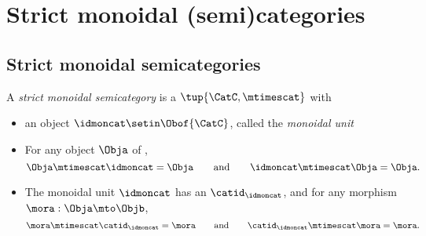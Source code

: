 
\section{Strict monoidal (semi)categories}

\subsection{Strict monoidal semicategories}

\begin{ctdefinition}
    \label{def:strict-monoidal-semicat}
    A \emph{strict monoidal semicategory} is a  $\tup{\CatC, \mtimescat}$ with

    \constit

    \begin{itemize}
        \item an object $\idmoncat \setin \Obof{\CatC}$, called the \emph{monoidal unit}
    \end{itemize}

    \condit

    \begin{itemize}
        \item For any object $\Obja$ of \CatC,
              \begin{equation}
                  \Obja \mtimescat \idmoncat = \Obja \qquad \text{and} \qquad  \idmoncat \mtimescat  \Obja = \Obja.
              \end{equation}
        \item The monoidal unit $\idmoncat$ has an  $\catid_\idmoncat$, and for any morphism $\mora: \Obja \mto \Objb$,
              \begin{equation}
                  \mora \mtimescat \catid_\idmoncat = \mora \qquad \text{and} \qquad \catid_\idmoncat \mtimescat  \mora = \mora.
              \end{equation}
    \end{itemize}

\end{ctdefinition}



